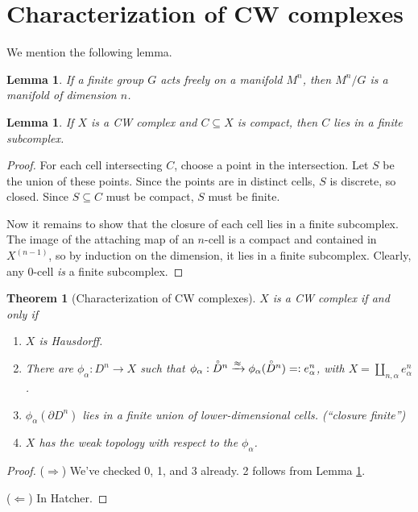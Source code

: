 \documentclass[12pt]{article}
\theoremstyle{plain}
\newtheorem{theorem}[equation]{Theorem}
\newtheorem{lemma}[equation]{Lemma}
\theoremstyle{definition}
\theoremstyle{remark}
\newcommand{\inn}[1]{\accentset{\circ}{#1}}
\begin{document}
 \section{Characterization of CW complexes}
 We mention the following lemma.
 \begin{lemma}
   If a finite group $G$ acts freely on a manifold $M^n$, then $M^n/G$ is a manifold of
   dimension $n$.
 \end{lemma}
 \begin{lemma}\label{L:cmptinCW}
   If $X$ is a CW complex and $C\subseteq X$ is compact, then $C$ lies in a finite
   subcomplex.
 \end{lemma}
 \begin{proof}
   For each cell intersecting $C$, choose a point in the intersection. Let $S$ be the
   union of these points. Since the points are in distinct cells, $S$ is discrete, so
   closed. Since $S\subseteq C$ must be compact, $S$ must be finite.

   Now it remains to show that the closure of each cell lies in a finite subcomplex. The
   image of the attaching map of an $n$-cell is a compact and contained in $X^{(n-1)}$,
   so by induction on the dimension, it lies in a finite subcomplex. Clearly, any 0-cell
   \emph{is} a finite subcomplex.
 \end{proof}
 \begin{theorem}[Characterization of CW complexes]
   $X$ is a CW complex if and only if
   \begin{enumerate}
     \item[0.] $X$ is Hausdorff.

     \item
     There
     are $\phi_\alpha:D^n\to X$ such that $\phi_\alpha:\inn D^n\xrightarrow{\approx}
     \phi_\alpha(\inn D^n) =: e^n_\alpha$, with $X= \coprod_{n,\alpha} e^n_\alpha$.

     \item $\phi_\alpha(\partial D^n)$ lies in a finite union of lower-dimensional cells.
     (``closure finite'')

     \item $X$ has the weak topology with respect to the $\phi_\alpha$.
   \end{enumerate}
 \end{theorem}
 \begin{proof}
   ($\Rightarrow$) We've checked 0, 1, and 3 already. 2 follows from Lemma
   \ref{L:cmptinCW}.

   ($\Leftarrow$) In Hatcher.
 \end{proof}
\end{document}
